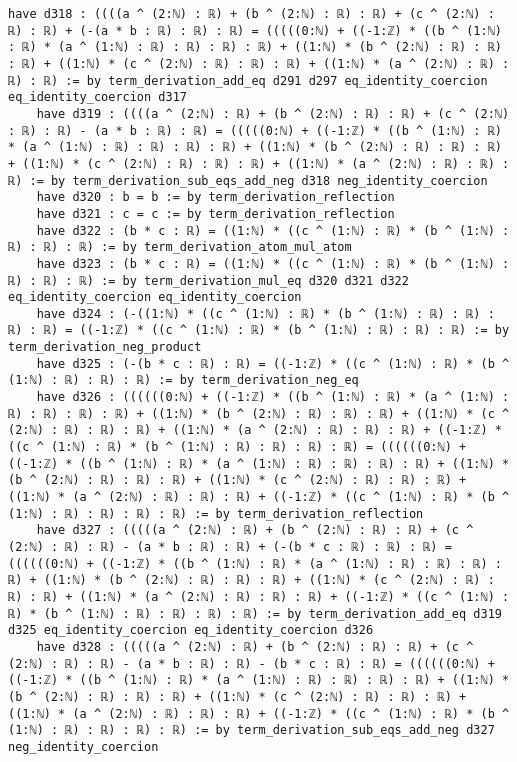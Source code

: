 \documentclass{article}
\begin{document}
\begin{tcolorbox}[colback=white!10, width=\linewidth]
\begin{lstlisting}[language=Lean4]
    have d318 : ((((a ^ (2:ℕ) : ℝ) + (b ^ (2:ℕ) : ℝ) : ℝ) + (c ^ (2:ℕ) : ℝ) : ℝ) + (-(a * b : ℝ) : ℝ) : ℝ) = (((((0:ℕ) + ((-1:ℤ) * ((b ^ (1:ℕ) : ℝ) * (a ^ (1:ℕ) : ℝ) : ℝ) : ℝ) : ℝ) + ((1:ℕ) * (b ^ (2:ℕ) : ℝ) : ℝ) : ℝ) + ((1:ℕ) * (c ^ (2:ℕ) : ℝ) : ℝ) : ℝ) + ((1:ℕ) * (a ^ (2:ℕ) : ℝ) : ℝ) : ℝ) := by term_derivation_add_eq d291 d297 eq_identity_coercion eq_identity_coercion d317
    have d319 : ((((a ^ (2:ℕ) : ℝ) + (b ^ (2:ℕ) : ℝ) : ℝ) + (c ^ (2:ℕ) : ℝ) : ℝ) - (a * b : ℝ) : ℝ) = (((((0:ℕ) + ((-1:ℤ) * ((b ^ (1:ℕ) : ℝ) * (a ^ (1:ℕ) : ℝ) : ℝ) : ℝ) : ℝ) + ((1:ℕ) * (b ^ (2:ℕ) : ℝ) : ℝ) : ℝ) + ((1:ℕ) * (c ^ (2:ℕ) : ℝ) : ℝ) : ℝ) + ((1:ℕ) * (a ^ (2:ℕ) : ℝ) : ℝ) : ℝ) := by term_derivation_sub_eqs_add_neg d318 neg_identity_coercion
    have d320 : b = b := by term_derivation_reflection
    have d321 : c = c := by term_derivation_reflection
    have d322 : (b * c : ℝ) = ((1:ℕ) * ((c ^ (1:ℕ) : ℝ) * (b ^ (1:ℕ) : ℝ) : ℝ) : ℝ) := by term_derivation_atom_mul_atom
    have d323 : (b * c : ℝ) = ((1:ℕ) * ((c ^ (1:ℕ) : ℝ) * (b ^ (1:ℕ) : ℝ) : ℝ) : ℝ) := by term_derivation_mul_eq d320 d321 d322 eq_identity_coercion eq_identity_coercion
    have d324 : (-((1:ℕ) * ((c ^ (1:ℕ) : ℝ) * (b ^ (1:ℕ) : ℝ) : ℝ) : ℝ) : ℝ) = ((-1:ℤ) * ((c ^ (1:ℕ) : ℝ) * (b ^ (1:ℕ) : ℝ) : ℝ) : ℝ) := by term_derivation_neg_product
    have d325 : (-(b * c : ℝ) : ℝ) = ((-1:ℤ) * ((c ^ (1:ℕ) : ℝ) * (b ^ (1:ℕ) : ℝ) : ℝ) : ℝ) := by term_derivation_neg_eq
    have d326 : ((((((0:ℕ) + ((-1:ℤ) * ((b ^ (1:ℕ) : ℝ) * (a ^ (1:ℕ) : ℝ) : ℝ) : ℝ) : ℝ) + ((1:ℕ) * (b ^ (2:ℕ) : ℝ) : ℝ) : ℝ) + ((1:ℕ) * (c ^ (2:ℕ) : ℝ) : ℝ) : ℝ) + ((1:ℕ) * (a ^ (2:ℕ) : ℝ) : ℝ) : ℝ) + ((-1:ℤ) * ((c ^ (1:ℕ) : ℝ) * (b ^ (1:ℕ) : ℝ) : ℝ) : ℝ) : ℝ) = ((((((0:ℕ) + ((-1:ℤ) * ((b ^ (1:ℕ) : ℝ) * (a ^ (1:ℕ) : ℝ) : ℝ) : ℝ) : ℝ) + ((1:ℕ) * (b ^ (2:ℕ) : ℝ) : ℝ) : ℝ) + ((1:ℕ) * (c ^ (2:ℕ) : ℝ) : ℝ) : ℝ) + ((1:ℕ) * (a ^ (2:ℕ) : ℝ) : ℝ) : ℝ) + ((-1:ℤ) * ((c ^ (1:ℕ) : ℝ) * (b ^ (1:ℕ) : ℝ) : ℝ) : ℝ) : ℝ) := by term_derivation_reflection
    have d327 : (((((a ^ (2:ℕ) : ℝ) + (b ^ (2:ℕ) : ℝ) : ℝ) + (c ^ (2:ℕ) : ℝ) : ℝ) - (a * b : ℝ) : ℝ) + (-(b * c : ℝ) : ℝ) : ℝ) = ((((((0:ℕ) + ((-1:ℤ) * ((b ^ (1:ℕ) : ℝ) * (a ^ (1:ℕ) : ℝ) : ℝ) : ℝ) : ℝ) + ((1:ℕ) * (b ^ (2:ℕ) : ℝ) : ℝ) : ℝ) + ((1:ℕ) * (c ^ (2:ℕ) : ℝ) : ℝ) : ℝ) + ((1:ℕ) * (a ^ (2:ℕ) : ℝ) : ℝ) : ℝ) + ((-1:ℤ) * ((c ^ (1:ℕ) : ℝ) * (b ^ (1:ℕ) : ℝ) : ℝ) : ℝ) : ℝ) := by term_derivation_add_eq d319 d325 eq_identity_coercion eq_identity_coercion d326
    have d328 : (((((a ^ (2:ℕ) : ℝ) + (b ^ (2:ℕ) : ℝ) : ℝ) + (c ^ (2:ℕ) : ℝ) : ℝ) - (a * b : ℝ) : ℝ) - (b * c : ℝ) : ℝ) = ((((((0:ℕ) + ((-1:ℤ) * ((b ^ (1:ℕ) : ℝ) * (a ^ (1:ℕ) : ℝ) : ℝ) : ℝ) : ℝ) + ((1:ℕ) * (b ^ (2:ℕ) : ℝ) : ℝ) : ℝ) + ((1:ℕ) * (c ^ (2:ℕ) : ℝ) : ℝ) : ℝ) + ((1:ℕ) * (a ^ (2:ℕ) : ℝ) : ℝ) : ℝ) + ((-1:ℤ) * ((c ^ (1:ℕ) : ℝ) * (b ^ (1:ℕ) : ℝ) : ℝ) : ℝ) : ℝ) := by term_derivation_sub_eqs_add_neg d327 neg_identity_coercion

\end{lstlisting}
\end{tcolorbox}
\end{document}

